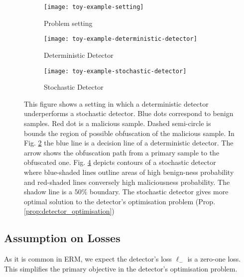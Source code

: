 \begin{figure}[p]
    \centering

        \begin{subfigure}[b]{0.6\textwidth}
            \texttt{[image: toy-example-setting]}
            \caption{Problem setting}\label{fig:toy-example-setting}
        \end{subfigure}

        \begin{subfigure}[b]{0.6\textwidth}
            \texttt{[image: toy-example-deterministic-detector]}
            \caption{Deterministic Detector}\label{fig:toy-example-deterministic-detector}
        \end{subfigure}

        \begin{subfigure}[b]{0.6\textwidth}
            \texttt{[image: toy-example-stochastic-detector]}
            \caption{Stochastic Detector}\label{fig:toy-example-stochastic-detector}
        \end{subfigure}

    \caption{This figure shows a setting in which a deterministic detector underperforms a stochastic detector. Blue dots correspond to benign samples. Red dot is a malicious sample. Dashed semi-circle is bounds the region of possible obfuscation of the malicious sample. In Fig. \ref{fig:toy-example-deterministic-detector} the blue line is a decision line of a deterministic detector. The arrow shows the obfuscation path from a primary sample to the obfuscated one. Fig. \ref{fig:toy-example-stochastic-detector} depicts contours of a stochastic detector where blue-shaded lines outline areas of high benign-ness probability and red-shaded lines conversely high maliciousness probability. The shadow line is a $50 \%$ boundary. The stochastic detector gives more optimal solution to the detector's optimisation problem (Prop. \ref{prop:detector_optimisation})
    }
\end{figure}

\subsection{Assumption on Losses}
As it is common in ERM, we expect the detector's loss $\ell_\minus$ is a zero-one loss. This simplifies the primary objective in the detector's optimisation problem.


